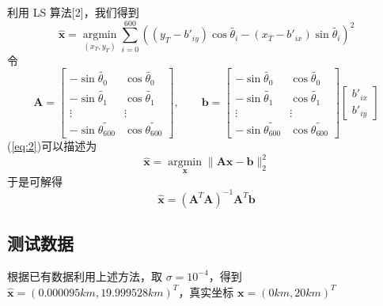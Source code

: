 \documentclass[UTF8]{ctexart}
\begin{document}
利用 LS 算法[2]，我们得到
\begin{equation}
    \hat{\bm{x}} = \mathop {\arg \min}\limits_{(x_T,y_T)} \sum\limits_{i=0}^{600} ((y_T-b'_{iy})\cos \tilde{\theta_i} - (x_T-b'_{ix})\sin \tilde{\theta_i})^2 \label{eq:2}
\end{equation}
令
\begin{equation*}
    \bm{A} = \begin{bmatrix}
        -\sin \tilde{\theta_0} & \cos \tilde{\theta_0} \\
        -\sin \tilde{\theta_1} & \cos \tilde{\theta_1} \\
        \vdots & \vdots \\
        -\sin \tilde{\theta_{600}} & \cos \tilde{\theta_{600}}
    \end{bmatrix}, \qquad 
    \bm{b} = \begin{bmatrix}
        -\sin \tilde{\theta_0} & \cos \tilde{\theta_0} \\
        -\sin \tilde{\theta_1} & \cos \tilde{\theta_1} \\
        \vdots & \vdots \\
        -\sin \tilde{\theta_{600}} & \cos \tilde{\theta_{600}}
    \end{bmatrix}\begin{bmatrix}
        b'_{ix} \\
        b'_{iy}
    \end{bmatrix}
\end{equation*}
(\ref{eq:2})可以描述为
\begin{equation}
    \hat{\bm{x}} = \mathop{\arg \min}\limits_{\bm{x}} \| \bm{A}\bm{x} -\bm{b} \|_2^2
\end{equation}
于是可解得
\begin{equation}
    \hat{\bm{x}} = (\bm{A}^T \bm{A})^{-1} \bm{A}^T \bm{b} 
\end{equation}

\subsection{测试数据}
根据已有数据利用上述方法，取 $\sigma = 10^{-4}$，得到 $\hat{\bm{x}}=(0.000095km,19.999528km)^T$，真实坐标 $\bm{x}=(0km,20km)^T$

\begin{figure}[h]
    \centering
\end{figure}
\end{document}
